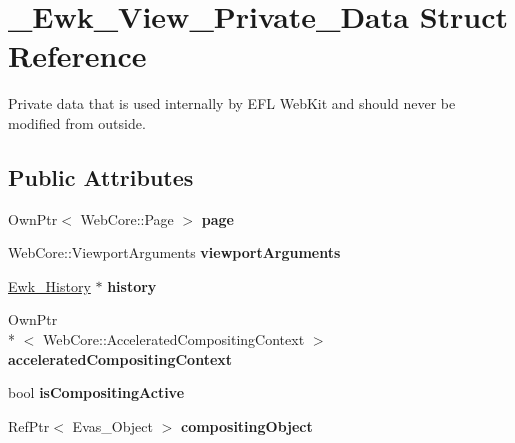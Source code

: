 \hypertarget{struct__Ewk__View__Private__Data}{\section{\+\_\+\+Ewk\+\_\+\+View\+\_\+\+Private\+\_\+\+Data Struct Reference}
\label{struct__Ewk__View__Private__Data}
}


Private data that is used internally by E\+F\+L Web\+Kit and should never be modified from outside.  


\subsection*{Public Attributes}
\begin{DoxyCompactItemize}
\item 
\hypertarget{struct__Ewk__View__Private__Data_a6ef9a6744442f18f8a313b198b62b87a}{Own\+Ptr$<$ Web\+Core\+::\+Page $>$ {\bfseries page}}\label{struct__Ewk__View__Private__Data_a6ef9a6744442f18f8a313b198b62b87a}

\item 
\hypertarget{struct__Ewk__View__Private__Data_a37ff13e12c21fccb4a74c0fa835377a0}{Web\+Core\+::\+Viewport\+Arguments {\bfseries viewport\+Arguments}}\label{struct__Ewk__View__Private__Data_a37ff13e12c21fccb4a74c0fa835377a0}

\item 
\hypertarget{struct__Ewk__View__Private__Data_aca902ed7f20d6f345c678a8185aab50a}{\hyperlink{struct__Ewk__History}{Ewk\+\_\+\+History} $\ast$ {\bfseries history}}\label{struct__Ewk__View__Private__Data_aca902ed7f20d6f345c678a8185aab50a}

\item 
\hypertarget{struct__Ewk__View__Private__Data_a03cd2f48fb2c5cbd57e8d4f556f6db67}{Own\+Ptr\\*
$<$ Web\+Core\+::\+Accelerated\+Compositing\+Context $>$ {\bfseries accelerated\+Compositing\+Context}}\label{struct__Ewk__View__Private__Data_a03cd2f48fb2c5cbd57e8d4f556f6db67}

\item 
\hypertarget{struct__Ewk__View__Private__Data_a9224654fceb2e3aa0321aee1528368b8}{bool {\bfseries is\+Compositing\+Active}}\label{struct__Ewk__View__Private__Data_a9224654fceb2e3aa0321aee1528368b8}

\item 
\hypertarget{struct__Ewk__View__Private__Data_a706b6f5500f5a456cc1d9d686fc7e36c}{Ref\+Ptr$<$ Evas\+\_\+\+Object $>$ {\bfseries compositing\+Object}}\label{struct__Ewk__View__Private__Data_a706b6f5500f5a456cc1d9d686fc7e36c}


\end{DoxyCompactItemize}
